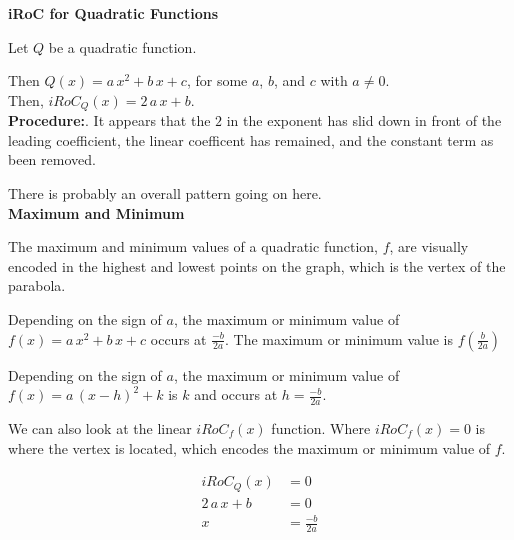 \documentclass{ximera}
\begin{document}
\begin{procedure} \textbf{\textcolor{blue!75!black}{iRoC for Quadratic Functions}} 



Let $Q$ be a quadratic function.

Then $Q(x) = a \, x^2 + b \, x + c$, for some $a$, $b$, and $c$ with $a \ne 0$. \\

Then, $iRoC_Q(x) = 2 \, a \, x + b$. \\


\textbf{Procedure:}. It appears that the $2$ in the exponent has slid down in front of the leading coefficient, the linear coefficent has remained, and the constant term as been removed. 



\end{procedure}

There is probably an overall pattern going on here. \\










\textbf{\textcolor{blue!55!black}{Maximum and Minimum}}



The maximum and minimum values of a quadratic function, $f$, are visually encoded in the highest and lowest points on the  graph, which is the vertex of the parabola.

Depending on the sign of $a$, the maximum or minimum value of $f(x) = a \, x^2 + b \, x + c$ occurs at $\frac{-b}{2a}$. The maximum or minimum value is $f\left( \frac{b}{2a} \right)$


Depending on the sign of $a$, the maximum or minimum value of $f(x) = a \, (x - h)^2 + k$ is $k$ and occurs at $h = \frac{-b}{2a}$. 







We can also look at the linear $iRoC_f(x)$ function.  Where $iRoC_f(x) = 0$ is where the vertex is located, which encodes the maximum or minimum value of $f$.





\begin{align*}
iRoC_Q(x)       &= 0  \\
2 \, a \, x + b  & = 0  \\
x     &=  \frac{-b}{2a}
\end{align*}
\end{document}

